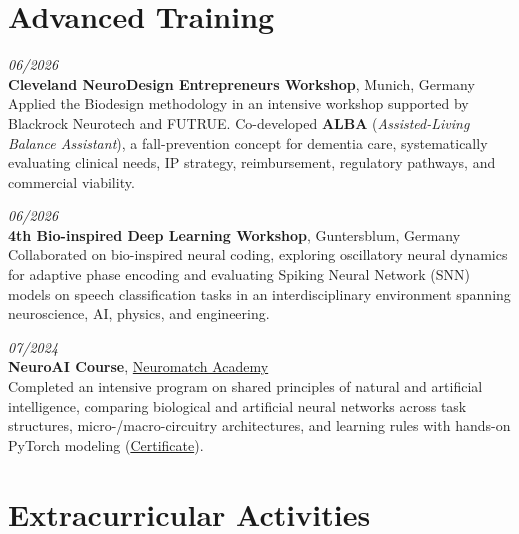 \documentclass[a4paper,10pt]{article}
\newcommand{\cvdate}[1]{\textit{#1}}
\begin{document}
\section{Advanced Training}

\cvdate{06/2026}\\
\textbf{Cleveland NeuroDesign Entrepreneurs Workshop}, Munich, Germany\\
Applied the Biodesign methodology in an intensive workshop supported by Blackrock Neurotech and FUTRUE. Co-developed \textbf{ALBA} (\textit{Assisted-Living Balance Assistant}), a fall-prevention concept for dementia care, systematically evaluating clinical needs, IP strategy, reimbursement, regulatory pathways, and commercial viability.

\vspace{4pt}
\cvdate{06/2026}\\
\textbf{4th Bio-inspired Deep Learning Workshop}, Guntersblum, Germany\\
Collaborated on bio-inspired neural coding, exploring oscillatory neural dynamics for adaptive phase encoding and evaluating Spiking Neural Network (SNN) models on speech classification tasks in an interdisciplinary environment spanning neuroscience, AI, physics, and engineering.

\vspace{4pt}
\cvdate{07/2024}\\
\textbf{NeuroAI Course}, \href{https://neuroai.neuromatch.io}{Neuromatch Academy}\\
Completed an intensive program on shared principles of natural and artificial intelligence, comparing biological and artificial neural networks across task structures, micro-/macro-circuitry architectures, and learning rules with hands-on PyTorch modeling (\href{https://portal.neuromatchacademy.org/certificate/1bc42cc1-9dea-4526-a6ee-c671a9172016}{Certificate}).

\section{Extracurricular Activities}
\end{document}
